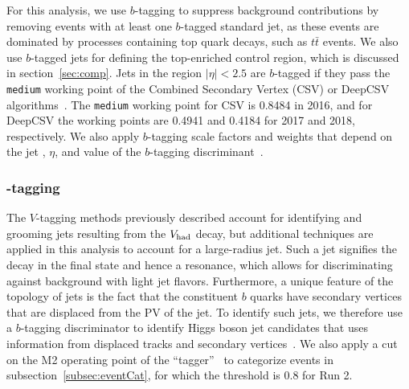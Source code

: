 For this analysis, we use $b$-tagging to suppress background contributions by removing events with at least one $b$-tagged standard jet, as these events are dominated by processes containing top quark decays, such as $t\bar{t}$ events.
We also use $b$-tagged jets for defining the top-enriched control region, which is discussed in section~\ref{sec:comp}.
Jets in the region $|\eta|<2.5$ are $b$-tagged if they pass the \texttt{medium} working point of the Combined Secondary Vertex (CSV) or DeepCSV algorithms~\cite{Sirunyan_jet}.
The \texttt{medium} working point for CSV is 0.8484 in 2016, and for DeepCSV the working points are 0.4941 and 0.4184 for 2017 and 2018, respectively.
We also apply $b$-tagging scale factors and weights that depend on the jet \pt, $\eta$, and value of the $b$-tagging discriminant~\cite{bTaggingEff,bTaggingSF}.

\subsubsection{\bbbar-tagging}

The $V$-tagging methods previously described account for identifying and grooming jets resulting from the $V_\mathrm{had}$ decay, but additional techniques are applied in this analysis to account for a large-radius \bbbar jet.
Such a jet signifies the decay \Htobbbar in the final state and hence a \WH resonance, which allows for discriminating against background with light jet flavors.
Furthermore, a unique feature of the topology of \bbbar jets is the fact that the constituent $b$ quarks have secondary vertices that are displaced from the PV of the jet.
To identify such \bbbar jets, we therefore use a $b$-tagging discriminator to identify Higgs boson jet candidates that uses information from displaced tracks and secondary vertices~\cite{CMS-PAS-BTV-15-002}.
We also apply a cut on the M2 operating point of the ``\DoubleB tagger''~\cite{Sirunyan_jet} to categorize events in subsection~\ref{subsec:eventCat}, for which the threshold is 0.8 for Run 2.

